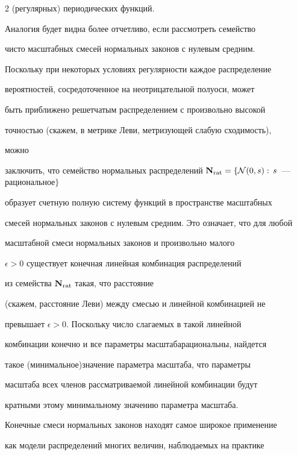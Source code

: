 \begin{multicols}{2}
(регулярных) периодических функций.





Аналогия будет видна более отчетливо, если рассмотреть семейство


чисто масштабных смесей нормальных законов с нулевым средним.


Поскольку при некоторых условиях регулярности каж\-дое распределение


вероятностей, сосредоточенное на неотрицательной полуоси, может


быть приближено решетчатым распределением с произвольно высокой


точностью (скажем, в метрике Леви, метризующей слабую сходимость),


можно\linebreak


заключить, что семейство нормальных распределений ${\bf


N}_{\mathrm{rat}}=\{\mathcal{N}(0,s):\,s$~--- рациональное$\}$


образует счетную полную систему функций в пространстве масштабных


смесей нормальных законов с нулевым средним. Это означает, что для любой


масштабной смеси нормальных законов и произвольно малого


$\epsilon>0$ существует конечная линейная комбинация распределений


из семейства ${\bf N}_{\mathrm{rat}}$ такая, что рас\-стояние


(скажем, расстояние Леви) между смесью и линейной комбинацией не


превышает $\epsilon>0$. Поскольку число слагаемых в такой линейной


комбинации конечно и все па\-ра\-мет\-ры масштаба\linebreak рациональны, найдется


такое (минимальное)\linebreak значение па\-ра\-мет\-ра масштаба, что параметры


масштаба всех членов рассматриваемой линейной комбинации будут


кратными этому минимальному значению па\-ра\-мет\-ра масштаба.





Конечные смеси нормальных законов находят самое широкое применение


как модели распределений многих величин, наблюдаемых на практике



\end{multicols}
